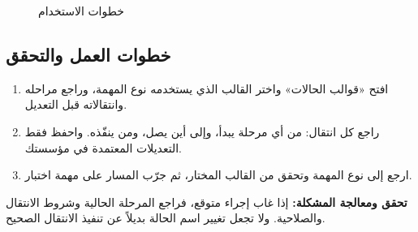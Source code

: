 \begin{figure}[H]
\centering
{}
\rclegend
\caption{خطوات الاستخدام}
\label{fig:tasks-statuses-flow}
\end{figure}

\subsection{خطوات العمل والتحقق}
\begin{enumerate}
\item افتح «قوالب الحالات» واختر القالب الذي يستخدمه نوع المهمة، وراجع مراحله وانتقالاته قبل التعديل.
\item راجع كل انتقال: من أي مرحلة يبدأ، وإلى أين يصل، ومن ينفّذه. واحفظ فقط التعديلات المعتمدة في مؤسستك.
\item ارجع إلى نوع المهمة وتحقق من القالب المختار، ثم جرّب المسار على مهمة اختبار.
\end{enumerate}

\textbf{تحقق ومعالجة المشكلة:} إذا غاب إجراء متوقع، فراجع المرحلة الحالية وشروط الانتقال والصلاحية. ولا تجعل تغيير اسم الحالة بديلاً عن تنفيذ الانتقال الصحيح.
